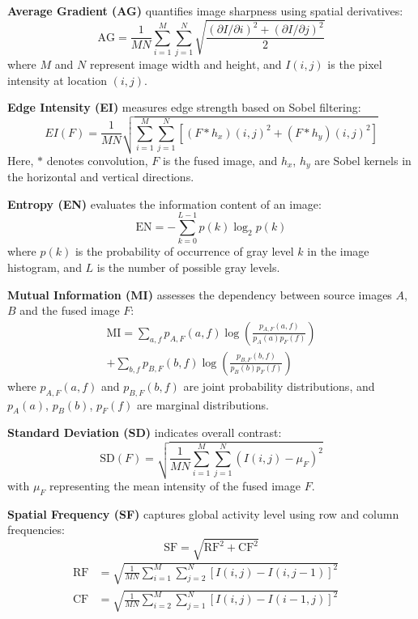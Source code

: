 \documentclass[journal]{IEEEtran}
\begin{document}
\textbf{Average Gradient (AG)} quantifies image sharpness using spatial derivatives:
\begin{equation}
    \text{AG} = \frac{1}{MN}\sum_{i=1}^{M}\sum_{j=1}^{N}\sqrt{\frac{(\partial I/\partial i)^2 + (\partial I/\partial j)^2}{2}}
\end{equation}
where \(M\) and \(N\) represent image width and height, and \(I(i,j)\) is the pixel intensity at location \((i,j)\).

\textbf{Edge Intensity (EI)} measures edge strength based on Sobel filtering:
\begin{equation}
    EI(F) = \frac{1}{MN} \sqrt{\sum_{i=1}^{M} \sum_{j=1}^{N} \left[ (F * h_x)(i,j)^2 + (F * h_y)(i,j)^2 \right] }
\end{equation}
Here, \(*\) denotes convolution, \(F\) is the fused image, and \(h_x\), \(h_y\) are Sobel kernels in the horizontal and vertical directions.

\textbf{Entropy (EN)} evaluates the information content of an image:
\begin{equation}
    \text{EN} = -\sum_{k=0}^{L-1} p(k)\log_2 p(k)
\end{equation}
where \(p(k)\) is the probability of occurrence of gray level \(k\) in the image histogram, and \(L\) is the number of possible gray levels.

\textbf{Mutual Information (MI)} assesses the dependency between source images \(A\), \(B\) and the fused image \(F\):
\begin{equation}
    \begin{aligned}
        \text{MI} = \sum_{a,f} p_{A,F}(a,f)\log\left(\frac{p_{A,F}(a,f)}{p_A(a)p_F(f)}\right) \\
        + \sum_{b,f} p_{B,F}(b,f)\log\left(\frac{p_{B,F}(b,f)}{p_B(b)p_F(f)}\right)
    \end{aligned}
\end{equation}
where \(p_{A,F}(a,f)\) and \(p_{B,F}(b,f)\) are joint probability distributions, and \(p_A(a)\), \(p_B(b)\), \(p_F(f)\) are marginal distributions.

\textbf{Standard Deviation (SD)} indicates overall contrast:
\begin{equation}
    \text{SD}(F) = \sqrt{\frac{1}{MN}\sum_{i=1}^{M} \sum_{j=1}^{N} \left( I(i,j) - \mu_F \right)^2}
\end{equation}
with \(\mu_F\) representing the mean intensity of the fused image \(F\).

\textbf{Spatial Frequency (SF)} captures global activity level using row and column frequencies:
\begin{equation}
    \text{SF} = \sqrt{ \text{RF}^2 + \text{CF}^2 }
\end{equation}
\begin{align}
    \text{RF} &= \sqrt{\frac{1}{MN}\sum_{i=1}^{M}\sum_{j=2}^{N}\left[ I(i,j) - I(i,j-1) \right]^2} \quad  \\
    \text{CF} &= \sqrt{\frac{1}{MN}\sum_{i=2}^{M}\sum_{j=1}^{N}\left[ I(i,j) - I(i-1,j) \right]^2} \quad 
\end{align}
\end{document}
